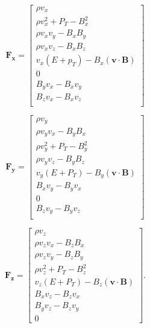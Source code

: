 \documentclass[modern, linenumbers]{aastex631}
\begin{document}
\begin{equation}
    \boldsymbol{F_x} = \begin{bmatrix}
            \rho v_{x} \\
            \rho v_{x}^2 + P_{T} - B_{x}^2 \\
            \rho v_{x} v_{y} - B_{x} B_{y} \\
            \rho v_{x} v_{z} - B_{x} B_{z} \\
            v_{x} \left( E + p_{T} \right) - B_{x} \left( \boldsymbol{v} \cdot \boldsymbol{B} \right) \\
            0 \\
            B_{y} v_{x} - B_{x} v_{y} \\
            B_{z} v_{x} - B_{x} v_{z} \\
         \end{bmatrix}
\end{equation}

\begin{equation}
    \boldsymbol{F_y} = \begin{bmatrix}
            \rho v_{y} \\
            \rho v_{y} v_{x} - B_{y} B_{x} \\
            \rho v_{y}^2 + P_{T} - B_{y}^2 \\
            \rho v_{y} v_{z} - B_{y} B_{z} \\
            v_{y} \left( E + P_{T} \right) - B_{y} \left( \boldsymbol{v} \cdot \boldsymbol{B} \right) \\
            B_{x} v_{y} - B_{y} v_{x} \\
            0 \\
            B_{z} v_{y} - B_{y} v_{z} \\
         \end{bmatrix}
\end{equation}

\begin{equation}
    \boldsymbol{F_z} = \begin{bmatrix}
            \rho v_{z} \\
            \rho v_{z} v_{x} - B_{z} B_{x} \\
            \rho v_{z} v_{y} - B_{z} B_{y} \\
            \rho v_{z}^2 + P_{T} - B_{z}^2 \\
            v_{z} \left( E + P_{T} \right) - B_{z} \left( \boldsymbol{v} \cdot \boldsymbol{B} \right) \\
            B_{x} v_{z} - B_{z} v_{x} \\
            B_{y} v_{z} - B_{z} v_{y} \\
            0
         \end{bmatrix}.
\end{equation}
\end{document}
